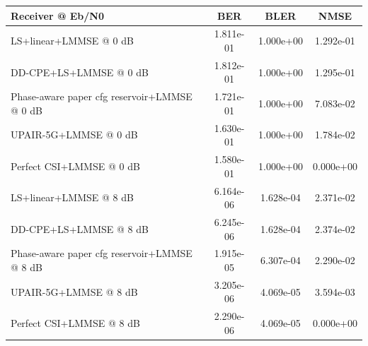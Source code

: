 \begin{tabular}{lccc}
\toprule
Receiver @ Eb/N0 & BER & BLER & NMSE \\
\midrule
LS+linear+LMMSE @ 0 dB & 1.811e-01 & 1.000e+00 & 1.292e-01 \\
DD-CPE+LS+LMMSE @ 0 dB & 1.812e-01 & 1.000e+00 & 1.295e-01 \\
Phase-aware paper cfg reservoir+LMMSE @ 0 dB & 1.721e-01 & 1.000e+00 & 7.083e-02 \\
UPAIR-5G+LMMSE @ 0 dB & 1.630e-01 & 1.000e+00 & 1.784e-02 \\
Perfect CSI+LMMSE @ 0 dB & 1.580e-01 & 1.000e+00 & 0.000e+00 \\
\midrule
LS+linear+LMMSE @ 8 dB & 6.164e-06 & 1.628e-04 & 2.371e-02 \\
DD-CPE+LS+LMMSE @ 8 dB & 6.245e-06 & 1.628e-04 & 2.374e-02 \\
Phase-aware paper cfg reservoir+LMMSE @ 8 dB & 1.915e-05 & 6.307e-04 & 2.290e-02 \\
UPAIR-5G+LMMSE @ 8 dB & 3.205e-06 & 4.069e-05 & 3.594e-03 \\
Perfect CSI+LMMSE @ 8 dB & 2.290e-06 & 4.069e-05 & 0.000e+00 \\
\bottomrule
\end{tabular}